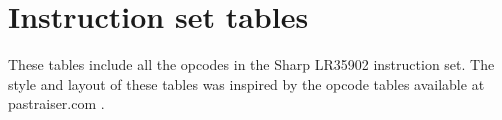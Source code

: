 \chapter{Instruction set tables}

These tables include all the opcodes in the Sharp LR35902 instruction set. The
style and layout of these tables was inspired by the opcode tables available at
pastraiser.com \cite{pastraiser}.

\begin{landscape}

\newcommand{\oplb}{\cellcolor{SkyBlue}}
\newcommand{\oplw}{\cellcolor{PaleGreen}}
\newcommand{\opab}{\cellcolor{Gold}}
\newcommand{\opaw}{\cellcolor{Pink}}
\newcommand{\opbi}{\cellcolor{Turquoise}}
\newcommand{\opcf}{\cellcolor{SandyBrown}}
\newcommand{\opmi}{\cellcolor{PaleVioletRed}}
\newcommand{\opun}{\cellcolor{Silver}}


\end{landscape}
